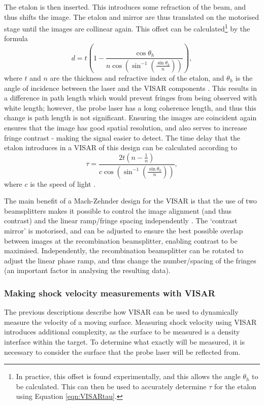 The etalon is then inserted. This introduces some refraction of the beam, and thus shifts the image. The etalon and mirror are thus translated on the motorised stage until the images are collinear again. This offset can be calculated\footnote{In practice, this offset is found experimentally, and this allows the angle $\theta_h$ to be calculated. This can then be used to accurately determine $\tau$ for the etalon using Equation \ref{eqn:VISARtau}.} by the formula \begin{equation} d = t \left(1 - \frac{\cos\theta_h}{n \cos(\sin^{-1}(\frac{\sin\theta_h}{n}))}\right), \end{equation} where $t$ and $n$ are the thickness and refractive index of the etalon, and $\theta_h$ is the angle of incidence between the laser and the VISAR components \cite{Bolme2013}. This results in a difference in path length which would prevent fringes from being observed with white length; however, the probe laser has a long coherence length, and thus this change is path length is not significant. Ensuring the images are coincident again ensures that the image has good spatial resolution, and also serves to increase fringe contrast - making the signal easier to detect. The time delay that the etalon introduces in a VISAR of this design can be calculated according to \begin{equation} \tau = \frac{2t (n - \frac{1}{n})}{c \cos(\sin^{-1}(\frac{\sin\theta_h}{n}))}, \label{eqn:VISARtau} \end{equation} where $c$ is the speed of light \cite{Bolme2013}. 

The main benefit of a Mach-Zehnder design for the VISAR is that the use of two beamsplitters makes it possible to control the image alignment (and thus contrast) and the linear ramp/fringe spacing independently \cite{Celliers2004}. The `contrast mirror' is motorised, and can be adjusted to ensure the best possible overlap between images at the recombination beamsplitter, enabling contrast to be maximised. Independently, the recombination beamsplitter can be rotated to adjust the linear phase ramp, and thus change the number/spacing of the fringes (an important factor in analysing the resulting data). 

\subsubsection{Making shock velocity measurements with VISAR}

The previous descriptions describe how VISAR can be used to dynamically measure the velocity of a moving surface. Measuring shock velocity using VISAR introduces additional complexity, as the surface to be measured is a density interface within the target. To determine what exactly will be measured, it is necessary to consider the surface that the probe laser will be reflected from.

